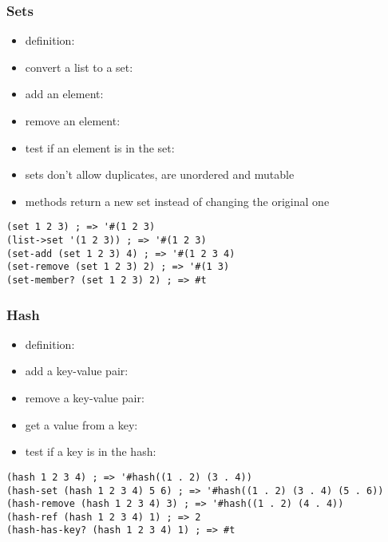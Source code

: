 \documentclass[a4paper,landscape,10pt]{article}
\begin{document}
\begin{multicols*}{2}
  \subsubsection{Sets}

  \begin{itemize}
    \item definition: 
    \item convert a list to a set: 
    \item add an element: 
    \item remove an element: 
    \item test if an element is in the set: 
    \item sets don't allow duplicates, are unordered and mutable
    \item methods return a new set instead of changing the original one
  \end{itemize}

  \begin{lstlisting}[language=Racket]
(set 1 2 3) ; => '#(1 2 3)
(list->set '(1 2 3)) ; => '#(1 2 3)
(set-add (set 1 2 3) 4) ; => '#(1 2 3 4)
(set-remove (set 1 2 3) 2) ; => '#(1 3)
(set-member? (set 1 2 3) 2) ; => #t
  \end{lstlisting}

  \subsubsection{Hash}

  \begin{itemize}
    \item definition: 
    \item add a key-value pair: 
    \item remove a key-value pair: 
    \item get a value from a key: 
    \item test if a key is in the hash: 
  \end{itemize}

  \begin{lstlisting}[language=Racket]
(hash 1 2 3 4) ; => '#hash((1 . 2) (3 . 4))
(hash-set (hash 1 2 3 4) 5 6) ; => '#hash((1 . 2) (3 . 4) (5 . 6))
(hash-remove (hash 1 2 3 4) 3) ; => '#hash((1 . 2) (4 . 4))
(hash-ref (hash 1 2 3 4) 1) ; => 2
(hash-has-key? (hash 1 2 3 4) 1) ; => #t
  \end{lstlisting}


\end{multicols*}
\end{document}
